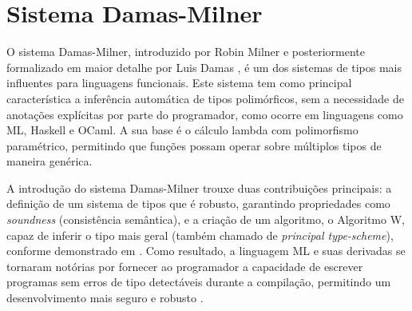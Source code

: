 


\chapter{Sistema Damas-Milner}\label{ch:damas-milner}

O sistema Damas-Milner, introduzido por Robin Milner e posteriormente formalizado em maior detalhe por Luis Damas \cite{MILNER1978, DAMAS1982}, é um dos sistemas de tipos mais influentes para linguagens funcionais.
Este sistema tem como principal característica a inferência automática de tipos polimórficos, sem a necessidade de anotações explícitas por parte do programador, como ocorre em linguagens como ML, Haskell e OCaml.
A sua base é o cálculo lambda com polimorfismo paramétrico, permitindo que funções possam operar sobre múltiplos tipos de maneira genérica.

A introdução do sistema Damas-Milner trouxe duas contribuições principais: a definição de um sistema de tipos que é robusto, garantindo propriedades como \textit{soundness} (consistência semântica), e a criação de um algoritmo, o Algoritmo W, capaz de inferir o tipo mais geral (também chamado de \textit{principal type-scheme}), conforme demonstrado em .
Como resultado, a linguagem ML e suas derivadas se tornaram notórias por fornecer ao programador a capacidade de escrever programas sem erros de tipo detectáveis durante a compilação, permitindo um desenvolvimento mais seguro e robusto \cite{MILNER1978, DAMAS1984}.

